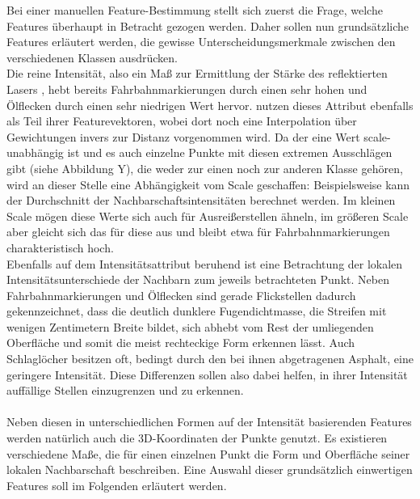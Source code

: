 Bei einer manuellen Feature-Bestimmung stellt sich zuerst die Frage, welche Features überhaupt in Betracht gezogen werden. Daher sollen nun grundsätzliche Features erläutert werden, die gewisse Unterscheidungsmerkmale zwischen den verschiedenen Klassen ausdrücken. \\
Die reine Intensität, also ein Maß zur Ermittlung der Stärke des reflektierten Lasers \citep{Tatoglu.Pochiraju-2012}, hebt bereits Fahrbahnmarkierungen durch einen sehr hohen und Ölflecken durch einen sehr niedrigen Wert hervor. \cite{Zhiqiang.etal-2019} nutzen dieses Attribut ebenfalls als Teil ihrer Featurevektoren, wobei dort noch eine Interpolation über Gewichtungen invers zur Distanz vorgenommen wird. Da der eine Wert scale-unabhängig ist und es auch einzelne Punkte mit diesen extremen Ausschlägen gibt (siehe Abbildung Y), die weder zur einen noch zur anderen Klasse gehören, wird an dieser Stelle eine Abhängigkeit vom Scale geschaffen: Beispielsweise kann der Durchschnitt der Nachbarschaftsintensitäten berechnet werden. Im kleinen Scale mögen diese Werte sich auch für Ausreißerstellen ähneln, im größeren Scale aber gleicht sich das für diese aus und bleibt etwa für Fahrbahnmarkierungen charakteristisch hoch. \\
Ebenfalls auf dem Intensitätsattribut beruhend ist eine Betrachtung der lokalen Intensitätsunterschiede der Nachbarn zum jeweils betrachteten Punkt. Neben Fahrbahnmarkierungen und Ölflecken sind gerade Flickstellen dadurch gekennzeichnet, dass die deutlich dunklere Fugendichtmasse, die Streifen mit wenigen Zentimetern Breite bildet, sich abhebt vom Rest der umliegenden Oberfläche und somit die meist rechteckige Form erkennen lässt. Auch Schlaglöcher besitzen oft, bedingt durch den bei ihnen abgetragenen Asphalt, eine geringere Intensität. Diese Differenzen sollen also dabei helfen, in ihrer Intensität auffällige Stellen einzugrenzen und zu erkennen. \\\\
Neben diesen in unterschiedlichen Formen auf der Intensität basierenden Features werden natürlich auch die 3D-Koordinaten der Punkte genutzt. Es existieren verschiedene Maße, die für einen einzelnen Punkt die Form und Oberfläche seiner lokalen Nachbarschaft beschreiben. Eine Auswahl dieser grundsätzlich einwertigen Features soll im Folgenden erläutert werden. \\
